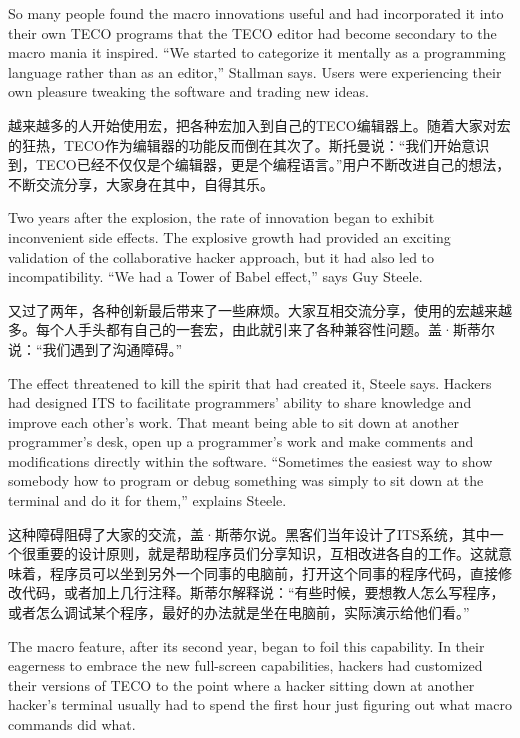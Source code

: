 \ifdefined\eng
So many people found the macro innovations useful and had incorporated it into their own TECO programs that the TECO editor had become secondary to the macro mania it inspired. ``We started to categorize it mentally as a programming language rather than as an editor,'' Stallman says. Users were experiencing their own pleasure tweaking the software and trading new ideas.
\fi

\ifdefined\chs
越来越多的人开始使用宏，把各种宏加入到自己的TECO编辑器上。随着大家对宏的狂热，TECO作为编辑器的功能反而倒在其次了。斯托曼说：``我们开始意识到，TECO已经不仅仅是个编辑器，更是个编程语言。''用户不断改进自己的想法，不断交流分享，大家身在其中，自得其乐。
\fi

\ifdefined\eng
Two years after the explosion, the rate of innovation began to exhibit inconvenient side effects. The explosive growth had provided an exciting validation of the collaborative hacker approach, but it had also led to incompatibility. ``We had a Tower of Babel effect,'' says Guy Steele.
\fi

\ifdefined\chs
又过了两年，各种创新最后带来了一些麻烦。大家互相交流分享，使用的宏越来越多。每个人手头都有自己的一套宏，由此就引来了各种兼容性问题。盖·斯蒂尔说：``我们遇到了沟通障碍。''
\fi

\ifdefined\eng
The effect threatened to kill the spirit that had created it, Steele says. Hackers had designed ITS to facilitate programmers' ability to share knowledge and improve each other's work. That meant being able to sit down at another programmer's desk, open up a programmer's work and make comments and modifications directly within the software. ``Sometimes the easiest way to show somebody how to program or debug something was simply to sit down at the terminal and do it for them,'' explains Steele.
\fi

\ifdefined\chs
这种障碍阻碍了大家的交流，盖·斯蒂尔说。黑客们当年设计了ITS系统，其中一个很重要的设计原则，就是帮助程序员们分享知识，互相改进各自的工作。这就意味着，程序员可以坐到另外一个同事的电脑前，打开这个同事的程序代码，直接修改代码，或者加上几行注释。斯蒂尔解释说：``有些时候，要想教人怎么写程序，或者怎么调试某个程序，最好的办法就是坐在电脑前，实际演示给他们看。''
\fi

\ifdefined\eng
The macro feature, after its second year, began to foil this capability. In their eagerness to embrace the new full-screen capabilities, hackers had customized their versions of TECO to the point where a hacker sitting down at another hacker's terminal usually had to spend the first hour just figuring out what macro commands did what.
\fi

